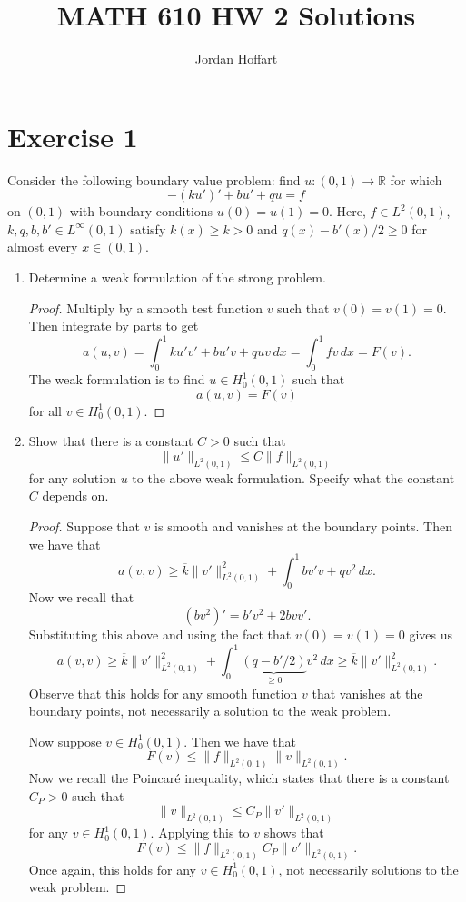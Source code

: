 \documentclass{article}
\title{MATH 610 HW 2 Solutions}
\author{Jordan Hoffart}
\date{}
\begin{document}
\maketitle
\section*{Exercise 1}
Consider the following boundary value problem: find $u:(0,1)\to\mathbb R$ for which \[-(ku')' + bu' + qu = f\] on $(0,1)$ with boundary conditions $u(0) = u(1) = 0$.
Here, $f \in L^2(0,1)$, $k,q,b,b' \in L^\infty(0,1)$ satisfy $k(x) \geq \overline k > 0$ and $q(x) - b'(x)/2 \geq 0$ for almost every $x \in (0,1)$.
\begin{enumerate}
	\item Determine a weak formulation of the strong problem.
	      \begin{proof}
		      Multiply by a smooth test function $v$ such that $v(0) = v(1) = 0$.
		      Then integrate by parts to get \[a(u,v) = \int_0^1ku'v' + bu'v + quv\,dx = \int_0^1 fv\,dx = F(v).\]
		      The weak formulation is to find $u \in H^1_0(0,1)$ such that \[a(u,v) = F(v)\] for all $v \in H^1_0(0,1)$.
	      \end{proof}
	\item Show that there is a constant $C > 0$ such that \[\|u'\|_{L^2(0,1)} \leq C\|f\|_{L^2(0,1)}\] for any solution $u$ to the above weak formulation.
	      Specify what the constant $C$ depends on.
	      \begin{proof}
		      Suppose that $v$ is smooth and vanishes at the boundary points.
		      Then we have that \[a(v,v) \geq \overline k \|v'\|_{L^2(0,1)}^2 + \int_0^1bv'v + qv^2\,dx.\]
		      Now we recall that \[(bv^2)' = b'v^2 + 2bvv'.\]
		      Substituting this above and using the fact that $v(0) = v(1) = 0$ gives us \[a(v,v) \geq \overline k\|v'\|_{L^2(0,1)}^2 + \int_0^1\underbrace{(q - b'/2)}_{\geq 0}v^2\,dx \geq \overline k\|v'\|_{L^2(0,1)}^2.\]
		      Observe that this holds for any smooth function $v$ that vanishes at the boundary points, not necessarily a solution to the weak problem.

		      Now suppose $v \in H^1_0(0,1)$.
		      Then we have that \[F(v) \leq \|f\|_{L^2(0,1)}\|v\|_{L^2(0,1)}.\]
		      Now we recall the Poincar\'e inequality, which states that there is a constant $C_P > 0$ such that \[\|v\|_{L^2(0,1)} \leq C_P\|v'\|_{L^2(0,1)}\] for any $v \in H^1_0(0,1).$
		      Applying this to $v$ shows that \[F(v) \leq \|f\|_{L^2(0,1)}C_P\|v'\|_{L^2(0,1)}.\]
		      Once again, this holds for any $v \in H^1_0(0,1)$, not necessarily solutions to the weak problem.


\end{proof}
\end{enumerate}
\end{document}
